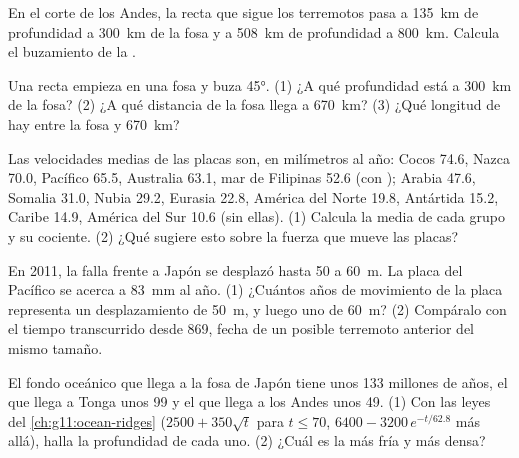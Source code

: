 \begin{exercise}[$\star\star$]\label{exo:g11:subduction-zones:6}
En el corte de los Andes, la recta que sigue los terremotos pasa a
\qty{135}{km} de profundidad a \qty{300}{km} de la fosa y a \qty{508}{km} de
profundidad a \qty{800}{km}. Calcula el buzamiento de la .
\end{exercise}

\begin{exercise}[$\star\star$]\label{exo:g11:subduction-zones:7}
Una  recta empieza en una fosa y buza \ang{45}. (1) ¿A qué profundidad
está a \qty{300}{km} de la fosa? (2) ¿A qué distancia de la fosa llega a
\qty{670}{km}? (3) ¿Qué longitud de  hay entre la fosa y
\qty{670}{km}?
\end{exercise}

\begin{exercise}[$\star\star$]\label{exo:g11:subduction-zones:8}
Las velocidades medias de las placas son, en milímetros al año: Cocos 74.6,
Nazca 70.0, Pacífico 65.5, Australia 63.1, mar de Filipinas 52.6 (con );
Arabia 47.6, Somalia 31.0, Nubia 29.2, Eurasia 22.8, América del Norte 19.8,
Antártida 15.2, Caribe 14.9, América del Sur 10.6 (sin ellas). (1) Calcula la
media de cada grupo y su cociente. (2) ¿Qué sugiere esto sobre la fuerza que
mueve las placas?
\end{exercise}

\begin{exercise}[$\star\star$]\label{exo:g11:subduction-zones:9}
En 2011, la falla frente a Japón se desplazó hasta 50 a \qty{60}{m}. La placa
del Pacífico se acerca a \qty{83}{mm} al año. (1) ¿Cuántos años de movimiento
de la placa representa un desplazamiento de \qty{50}{m}, y luego uno de
\qty{60}{m}? (2) Compáralo con el tiempo transcurrido desde 869, fecha de un
posible terremoto anterior del mismo tamaño.
\end{exercise}

\begin{exercise}[$\star\star$]\label{exo:g11:subduction-zones:10}
El fondo oceánico que llega a la fosa de Japón tiene unos 133 millones de
años, el que llega a Tonga unos 99 y el que llega a los Andes unos 49. (1) Con
las leyes del \cref{ch:g11:ocean-ridges} ($2500 + 350\sqrt{t}$ para
$t \le 70$, $6400 - 3200\,e^{-t/62.8}$ más allá), halla la profundidad de cada
uno. (2) ¿Cuál es la  más fría y más densa?
\end{exercise}

